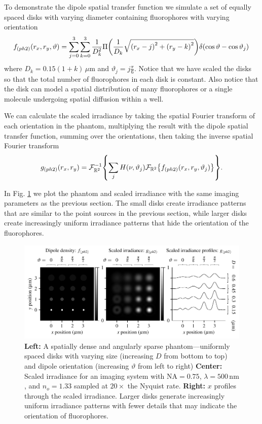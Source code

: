 \documentclass[]{osa-article}
\let\originalleft\left
\let\originalright\right
\renewcommand{\left}{\mathopen{}\mathclose\bgroup\originalleft}
\renewcommand{\right}{\aftergroup\egroup\originalright}
\providecommand{\mc}[1]{\mathcal{#1}}
\providecommand{\mbb}[1]{\mathbb{#1}}
\begin{document}
 To demonstrate the dipole spatial transfer function we simulate a set of
 equally spaced disks with varying diameter containing fluorophores with varying
 orientation
 \begin{align}
   f_{(ph2)}(r_x, r_y, \vartheta) = \sum_{j=0}^3 \sum_{k=0}^3 \frac{1}{D_k^2}\Pi\left(\frac{1}{D_k}\sqrt{\left(r_x - j\right)^2 + \left(r_y - k\right)^2}\right) \delta\left(\cos\vartheta - \cos\vartheta_j\right)\,\label{eq:phantom2}
 \end{align}
 where $D_k = 0.15(1+k)\, \mu$m and $\vartheta_j = j\frac{\pi }{6}$. Notice that
 we have scaled the disks so that the total number of fluorophores in each disk
 is constant. Also notice that the disk can model a spatial distribution of many
 fluorophores or a single molecule undergoing spatial diffusion within a well.  

 We can calculate the scaled irradiance by taking the spatial Fourier
   transform of each orientation in the phantom, multiplying the result with the
   dipole spatial transfer function, summing over the orientations, then taking
   the inverse spatial Fourier transform
 \begin{align}
   g_{(ph2)}(r_x, r_y) = \mc{F}^{-1}_{\mbb{R}^2}\left\{\sum_{j}H(\nu, \vartheta_j)\mc{F}_{\mbb{R}^2}\left\{f_{(ph2)}(r_x, r_y, \vartheta_j)\right\}\right\}.
 \end{align}

 In Fig. \ref{fig:ph2} we plot the phantom and scaled irradiance with the same
 imaging parameters as the previous section. The small disks create irradiance
 patterns that are similar to the point sources in the previous section, while
 larger disks create increasingly uniform irradiance patterns that hide the
 orientation of the fluorophores.
  
  \begin{figure}[ht]
 \centering
   \centering
   \includegraphics[scale=0.8]{../figures/paratfs/ph2.pdf}
   \caption{\textbf{Left:} A spatially dense and angularly sparse
     phantom---uniformly spaced disks with varying size (increasing $D$ from
     bottom to top) and dipole orientation (increasing $\vartheta$ from left to
     right) \textbf{Center:} Scaled irradiance for an imaging system with
     $\text{NA} = 0.75$, $\lambda = 500\,\text{nm}$, and $n_o = 1.33$ sampled at
     $20\times$ the Nyquist rate. \textbf{Right:} $x$ profiles through the
     scaled irradiance. Larger disks generate increasingly uniform irradiance
     patterns with fewer details that may indicate the orientation of
     fluorophores.}
   \label{fig:ph2}
 \end{figure}
\end{document}
